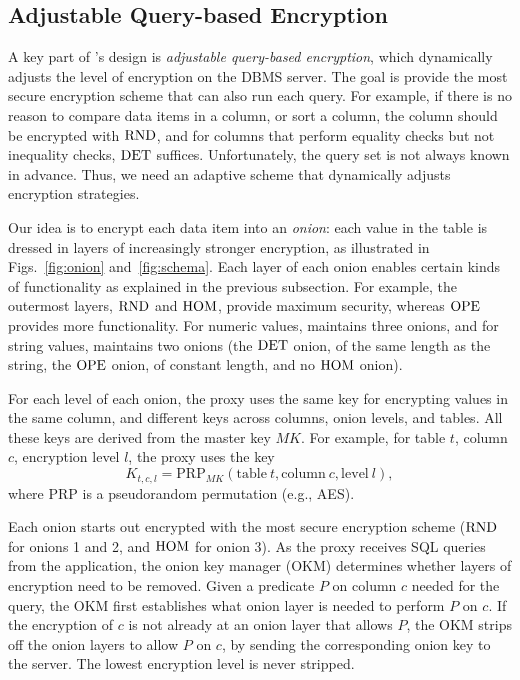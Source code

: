 \subsection{Adjustable Query-based Encryption}
\label{ss:onion}

A key part of \name{}'s design is \textit{adjustable query-based
  encryption}, which dynamically adjusts the level of encryption on
the DBMS server.  The goal is provide the most secure encryption
scheme that can also run each query.  For example, if there
is no reason to compare data items in a column, or sort a column, the
column should be encrypted with $\textrm{RND}$, and for columns that perform
equality checks but not inequality checks, $\textrm{DET}$ suffices.
Unfortunately, the query set is not always known in advance.
Thus, we need an adaptive scheme that dynamically
adjusts encryption strategies.

Our idea is to encrypt each data item into an \textit{onion}:
each value in the table is dressed in layers of increasingly stronger
encryption, as illustrated in Figs.~\ref{fig:onion} and~\ref{fig:schema}. Each layer of
each onion enables certain kinds of functionality as explained in the
previous subsection.  For example, the outermost layers, $\textrm{RND}$ and
$\textrm{HOM}$, provide maximum security, whereas $\textrm{OPE}$ provides more
functionality.  For numeric values, \name{} maintains three onions,
and for string values, \name{} maintains two onions (the $\textrm{DET}$ onion,
of the same length as the string, the $\textrm{OPE}$ onion, of constant length,
and no $\textrm{HOM}$ onion).


For each level of each onion, the proxy uses the same key for
encrypting values in the same column, and different keys across
columns, onion levels, and tables.  All these keys are derived from
the master key $\mathit{MK}$\@.  For example, for table $t$, column $c$,
encryption level $l$, the proxy uses the key
\begin{equation}\label{eq:columnkey}
K_{t, c, l} = \textrm{PRP}_\mathit{MK} (\mathrm{table}\>t, \mathrm{column}\>c,
    \mathrm{level}\>l),
\end{equation}
where PRP is a pseudorandom permutation (e.g., AES).

Each onion starts out encrypted with the most secure encryption scheme
($\textrm{RND}$ for onions 1 and 2, and $\textrm{HOM}$ for onion 3)\@.  As the proxy
receives SQL queries from the application, the onion key manager (OKM)
determines whether layers of encryption need to be removed.  Given a
predicate $P$ on column $c$ needed for the query, the OKM first
establishes what onion layer is needed to perform $P$ on $c$.  If the
encryption of $c$ is not already at an onion layer that allows $P$,
the OKM strips off the onion layers to allow $P$ on $c$, by sending
the corresponding onion key to the server. The lowest encryption level is never stripped.

